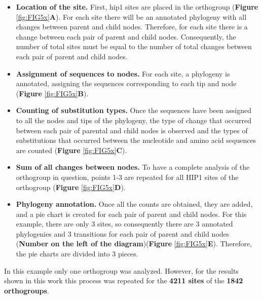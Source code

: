 \documentclass[
]{book}
\begin{document}
\begin{itemize}
\item
  \textbf{Location of the site.} First, hip1 sites are placed in the orthogroup (\textbf{Figure} \ref{fig:FIG5x}\textbf{A}). For each site there will be an annotated phylogeny with all changes between parent and child nodes. Therefore, for each site there is a change between each pair of parent and child nodes. Consequently, the number of total sites must be equal to the number of total changes between each pair of parent and child nodes.
\item
  \textbf{Assignment of sequences to nodes.} For each site, a phylogeny is annotated, assigning the sequences corresponding to each tip and node (\textbf{Figure} \ref{fig:FIG5x}\textbf{B}).
\item
  \textbf{Counting of substitution types.} Once the sequences have been assigned to all the nodes and tips of the phylogeny, the type of change that occurred between each pair of parental and child nodes is observed and the types of substitutions that occurred between the nucleotide and amino acid sequences are counted (\textbf{Figure} \ref{fig:FIG5x}\textbf{C}).
\item
  \textbf{Sum of all changes between nodes.} To have a complete analysis of the orthogroup in question, points 1-3 are repeated for all HIP1 sites of the orthogroup (\textbf{Figure} \ref{fig:FIG5x}\textbf{D}).
\item
  \textbf{Phylogeny annotation.} Once all the counts are obtained, they are added, and a pie chart is created for each pair of parent and child nodes. For this example, there are only 3 sites, so consequently there are 3 annotated phylogenies and 3 transitions for each pair of parent and child nodes (\textbf{Number on the left of the diagram})(\textbf{Figure} \ref{fig:FIG5x}\textbf{E}). Therefore, the pie charts are divided into 3 pieces.
\end{itemize}

In this example only one orthogroup was analyzed. However, for the results shown in this work this process was repeated for the \textbf{4211 sites} of the \textbf{1842 orthogroups}.
\end{document}
